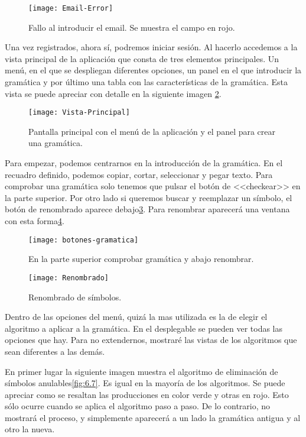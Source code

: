 \begin{figure}[h]
\centering
\texttt{[image: Email-Error]}
\caption{Fallo al introducir el email. Se muestra el campo en rojo.}
\label{fig:6.3}
\end{figure}

Una vez registrados, ahora sí, podremos iniciar sesión. Al hacerlo accedemos a la vista principal de la aplicación que consta de tres elementos principales. Un menú, en el que se despliegan diferentes opciones, un panel en el que introducir la gramática y por último una tabla con las características de la gramática. Esta vista se puede apreciar con detalle en la siguiente imagen \ref{fig:6.4}.


\begin{figure}[h]
\centering
\texttt{[image: Vista-Principal]}
\caption{Pantalla principal con el menú de la aplicación y el panel para crear una gramática.}
\label{fig:6.4}
\end{figure}

Para empezar, podemos centrarnos en la introducción de la gramática. En el recuadro definido, podemos copiar, cortar, seleccionar y pegar texto. Para comprobar una gramática solo tenemos que pulsar el botón de <<checkear>> en la parte superior. Por otro lado si queremos buscar y reemplazar un símbolo, el botón de renombrado aparece debajo\ref{fig:6.5}. Para renombrar aparecerá una ventana con esta forma\ref{fig:6.6}.

\begin{figure}[h]
\centering
\texttt{[image: botones-gramatica]}
\caption{En la parte superior comprobar gramática y abajo renombrar.}
\label{fig:6.5}
\end{figure}

\begin{figure}[h]
\centering
\texttt{[image: Renombrado]}
\caption{Renombrado de símbolos.}
\label{fig:6.6}
\end{figure}

Dentro de las opciones del menú, quizá la mas utilizada es la de elegir el algoritmo a aplicar a la gramática. En el desplegable se pueden ver todas las opciones que hay. Para no extendernos, mostraré las vistas de los algoritmos que sean diferentes a las demás. 

En primer lugar la siguiente imagen muestra el algoritmo de eliminación de símbolos anulables\ref{fig:6.7}. Es igual en la mayoría de los algoritmos. Se puede apreciar como se resaltan las producciones en color verde y otras en rojo. Esto sólo ocurre cuando se aplica el algoritmo paso a paso. De lo contrario, no mostrará el proceso, y simplemente aparecerá a un lado la gramática antigua y al otro la nueva.


